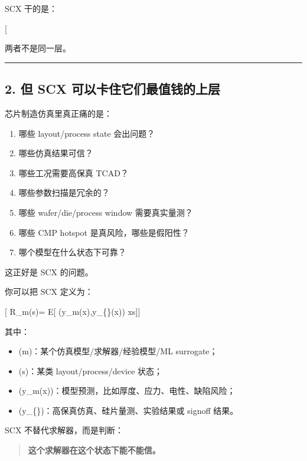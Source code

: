 \documentclass[
  12pt,
]{ctexart}
\providecommand{\tightlist}{%
  \setlength{\itemsep}{0pt}\setlength{\parskip}{0pt}}
\begin{document}
SCX 干的是：

{[}  \rightarrow
\text{trust / value / risk / next action}{]}

两者不是同一层。

\begin{center}\rule{0.5\linewidth}{0.5pt}\end{center}

\subsection{2. 但 SCX
可以卡住它们最值钱的上层}\label{ux4f46-scx-ux53efux4ee5ux5361ux4f4fux5b83ux4eecux6700ux503cux94b1ux7684ux4e0aux5c42}

芯片制造仿真里真正痛的是：

\begin{enumerate}
\def\labelenumi{\arabic{enumi}.}
\tightlist
\item
  哪些 layout/process state 会出问题？
\item
  哪些仿真结果可信？
\item
  哪些工况需要高保真 TCAD？
\item
  哪些参数扫描是冗余的？
\item
  哪些 wafer/die/process window 需要真实量测？
\item
  哪些 CMP hotspot 是真风险，哪些是假阳性？
\item
  哪个模型在什么状态下可靠？
\end{enumerate}

这正好是 SCX 的问题。

你可以把 SCX 定义为：

{[} R\_m(s)= \mathbb E{[} \ell(y\_m(x),y\_\{\}(x))
\mid x\in s{]}{]}

其中：

\begin{itemize}
\tightlist
\item
  (m)：某个仿真模型/求解器/经验模型/ML surrogate；
\item
  (s)：某类 layout/process/device 状态；
\item
  (y\_m(x))：模型预测，比如厚度、应力、电性、缺陷风险；
\item
  (y\_\{\})：高保真仿真、硅片量测、实验结果或 signoff 结果。
\end{itemize}

SCX 不替代求解器，而是判断：

\begin{quote}
\textbf{这个求解器在这个状态下能不能信。}
\end{quote}
\end{document}
